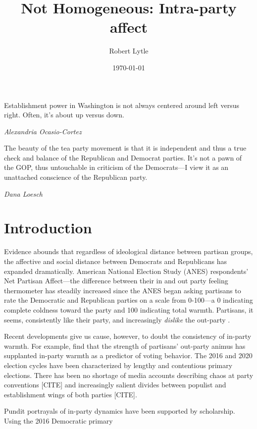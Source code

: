 \documentclass[12pt]{paper}
\begin{document}
\title{Not Homogeneous: Intra-party affect}
\author{Robert Lytle}
\date{\today}
\maketitle
\epigraph{Establishment power in Washington is not always centered around left versus right. Often, it’s about up versus down.}{\textit{Alexandria Ocasio-Cortez}}
\epigraph{The beauty of the tea party movement is that it is independent and thus a true check and balance of the Republican and Democrat parties. It's not a pawn of the GOP, thus untouchable in criticism of the Democrats---I view it as an unattached conscience of the Republican party.}{\textit{Dana Loesch}}



\section{Introduction}
Evidence abounds that regardless of ideological distance between partisan groups, the affective and social distance between Democrats and Republicans has expanded dramatically. American National Election Study (ANES) respondents' Net Partisan Affect---the difference between their in and out party feeling thermometer has steadily increased since the ANES began asking partisans to rate the Democratic and Republican parties on a scale from 0-100---a 0 indicating complete coldness toward the party and 100 indicating total warmth. Partisans, it seems, consistently like their party, and increasingly \textit{dislike} the out-party \citep{iyengar2012affect}.

Recent developments give us cause, however, to doubt the consistency of in-party warmth. For example, \cite{iyengar2018strengthening} find that the strength of partisans' out-party animus has supplanted in-party warmth as a predictor of voting behavior. The 2016 and 2020 election cycles have been characterized by lengthy and contentious primary elections. There has been no shortage of media accounts describing chaos at party conventions [CITE] and increasingly salient divides between populist and establishment wings of both parties [CITE].

 Pundit portrayals of in-party dynamics have been supported by scholarship.
Using the 2016 Democratic primary \cite{wronski2018tale}
\end{document}
